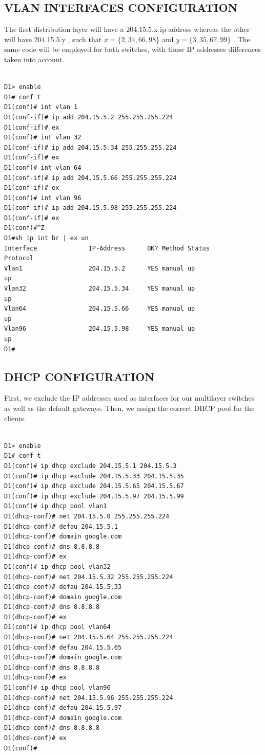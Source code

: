 \documentclass[ a4, 12pt, onecolumn]{IEEEtran}
\begin{document}
\subsection{VLAN INTERFACES CONFIGURATION}
The first distribution layer will have a 204.15.5.x ip address whereas the other will have 204.15.5.y , such that $x = \{2, 34, 66, 98\}$ and $y = \{3, 35, 67, 99\}$ .
The same code will be employed for both switches, with those IP addresses differences taken into account. 
\begin{center}
\begin{lstlisting}

D1> enable
D1# conf t
D1(conf)# int vlan 1
D1(conf-if)# ip add 204.15.5.2 255.255.255.224
D1(conf-if)# ex
D1(conf)# int vlan 32
D1(conf-if)# ip add 204.15.5.34 255.255.255.224
D1(conf-if)# ex
D1(conf)# int vlan 64
D1(conf-if)# ip add 204.15.5.66 255.255.255.224
D1(conf-if)# ex
D1(conf)# int vlan 96
D1(conf-if)# ip add 204.15.5.98 255.255.255.224
D1(conf-if)# ex
D1(conf)#^Z
D1#sh ip int br | ex un
Interface              IP-Address      OK? Method Status                Protocol 
Vlan1                  204.15.5.2      YES manual up                    up 
Vlan32                 204.15.5.34     YES manual up                    up 
Vlan64                 204.15.5.66     YES manual up                    up 
Vlan96                 204.15.5.98     YES manual up                    up
D1#

\end{lstlisting}
\end{center}

\subsection{DHCP CONFIGURATION}
First, we exclude the IP addresses used as interfaces for our multilayer switches as well as the default gateways. Then, we assign the correct DHCP pool for the clients.
\begin{center}
\begin{lstlisting}

D1> enable
D1# conf t
D1(conf)# ip dhcp exclude 204.15.5.1 204.15.5.3
D1(conf)# ip dhcp exclude 204.15.5.33 204.15.5.35
D1(conf)# ip dhcp exclude 204.15.5.65 204.15.5.67
D1(conf)# ip dhcp exclude 204.15.5.97 204.15.5.99
D1(conf)# ip dhcp pool vlan1
D1(dhcp-conf)# net 204.15.5.0 255.255.255.224
D1(dhcp-conf)# defau 204.15.5.1
D1(dhcp-conf)# domain google.com
D1(dhcp-conf)# dns 8.8.8.8
D1(dhcp-conf)# ex
D1(conf)# ip dhcp pool vlan32
D1(dhcp-conf)# net 204.15.5.32 255.255.255.224
D1(dhcp-conf)# defau 204.15.5.33
D1(dhcp-conf)# domain google.com
D1(dhcp-conf)# dns 8.8.8.8
D1(dhcp-conf)# ex
D1(conf)# ip dhcp pool vlan64
D1(dhcp-conf)# net 204.15.5.64 255.255.255.224
D1(dhcp-conf)# defau 204.15.5.65
D1(dhcp-conf)# domain google.com
D1(dhcp-conf)# dns 8.8.8.8
D1(dhcp-conf)# ex
D1(conf)# ip dhcp pool vlan96
D1(dhcp-conf)# net 204.15.5.96 255.255.255.224
D1(dhcp-conf)# defau 204.15.5.97
D1(dhcp-conf)# domain google.com
D1(dhcp-conf)# dns 8.8.8.8
D1(dhcp-conf)# ex
D1(conf)#
\end{lstlisting}
\end{center}
\end{document}
